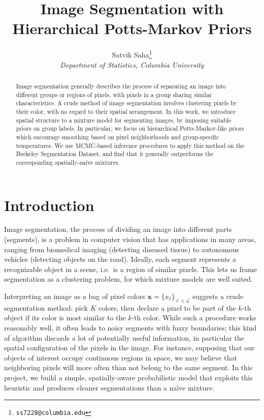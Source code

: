 \documentclass[12pt]{article}
\title{
    Image Segmentation with Hierarchical Potts-Markov Priors
}
\author{
    Satvik Saha\footnote{\texttt{ss7228@columbia.edu}}\\
    \textit{\normalsize Department of Statistics, Columbia University}
}
\date{}
\newcommand{\LL}{\mathcal{L}}
\begin{document}
\maketitle


\begin{abstract}
    Image segmentation generally describes the process of separating an image into
    different groups or regions of pixels, with pixels in a group sharing
    similar characteristics.
    A crude method of image segmentation involves clustering pixels by their color,
    with no regard to their spatial arrangement.
    In this work, we introduce spatial structure to a mixture model for
    segmenting images, by imposing suitable priors on group labels.
    In particular, we focus on hierarchical Potts-Markov-like priors which
    encourage smoothing based on pixel neighborhoods and group-specific
    temperatures.
    We use MCMC-based inference procedures to apply this method on the Berkeley
    Segmentation Dataset, and find that it generally outperforms the
    corresponding spatially-na\"ive mixtures.
\end{abstract}



\section{Introduction}


Image segmentation, the process of dividing an image into different parts
(segments), is a problem in computer vision that has applications in many
areas, ranging from biomedical imaging (detecting diseased tissue) to
autonomous vehicles (detecting objects on the road).
Ideally, each segment represents a recognizable object in a scene, i.e.\ is a
region of similar pixels.
This lets us frame segmentation as a clustering problem, for which mixture
models are well suited.

Interpreting an image as a bag of pixel colors $\bm{x} = \{x_\ell\}_{\ell \in
\LL}$ suggests a crude segmentation method: pick $K$ colors, then declare a
pixel to be part of the $k$-th object if its color is most similar to the
$k$-th color.
While such a procedure works reasonably well, it often leads to noisy segments
with fuzzy boundaries; this kind of algorithm discards a lot of potentially
useful information, in particular the spatial configuration of the pixels in
the image.
For instance, supposing that our objects of interest occupy continuous regions
in space, we may believe that neighboring pixels will more often than not
belong to the same segment.
In this project, we build a simple, spatially-aware probabilistic model that
exploits this heuristic and produces cleaner segmentations than a na\"ive
mixture.
\end{document}
